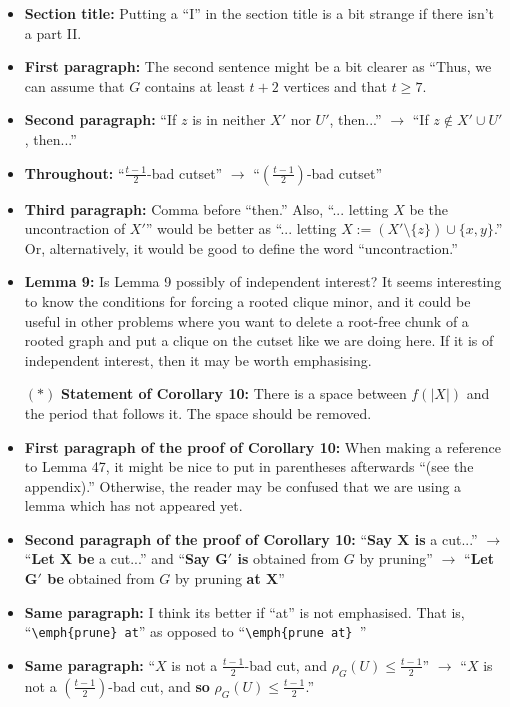 \documentclass[11 pt]{article}
\theoremstyle{definition}
\theoremstyle{case}
\numberwithin{equation}{section}
\begin{document}
\begin{itemize}
\item \textbf{Section title:} Putting a ``I'' in the section title is a bit strange if there isn't a part II. 
\item \textbf{First paragraph:} The second sentence might be a bit clearer as ``Thus, we can assume that $G$ contains at least $t+2$ vertices and that $t\geq7$. 
\item \textbf{Second paragraph:} ``If $z$ is in neither $X'$ nor $U'$, then...'' $\to$ ``If $z\notin X'\cup U'$, then...''
\item \textbf{Throughout:} ``$\frac{t-1}{2}$-bad cutset'' $\to$ ``$\left(\frac{t-1}{2}\right)$-bad cutset''
\item \textbf{Third paragraph:} Comma before ``then.'' Also, ``... letting $X$ be the uncontraction of $X'$'' would be better as ``... letting $X:=(X'\setminus \{z\})\cup\{x,y\}$.'' Or, alternatively, it would be good to define the word ``uncontraction.''
\item \textbf{Lemma 9:} Is Lemma 9 possibly of independent interest? It seems interesting to know the conditions for forcing a rooted clique minor, and it could be useful in other problems where you want to delete a root-free chunk of a rooted graph and put a clique on the cutset like we are doing here. If it is of independent interest, then it may be worth emphasising. 
\item[$\boldsymbol{(*)}$] \textbf{Statement of Corollary 10:} There is a space between $f(|X|)$ and the period that follows it. The space should be removed. 
\item \textbf{First paragraph of the proof of Corollary 10:} When making a reference to Lemma 47, it might be nice to put in parentheses afterwards ``(see the appendix).'' Otherwise, the reader may be confused that we are using a lemma which has not appeared yet.
\item \textbf{Second paragraph of the proof of Corollary 10:} ``\textbf{Say $\boldsymbol{X}$ is} a cut...'' $\to$ ``\textbf{Let $\boldsymbol{X}$ be} a cut...'' and ``\textbf{Say $\boldsymbol{G'}$ is} obtained from $G$ by pruning'' $\to$ ``\textbf{Let $\boldsymbol{G'}$ be} obtained from $G$ by pruning \textbf{at $\boldsymbol{X}$}''
\item \textbf{Same paragraph:} I think its better if ``at'' is not emphasised. That is, ``\texttt{\textbackslash{emph\{prune\}} at}'' as opposed to ``\texttt{\textbackslash{emph\{prune at\}} }''
\item \textbf{Same paragraph:} ``$X$ is not a $\frac{t-1}{2}$-bad cut, and $\rho_G(U)\leq \frac{t-1}{2}$'' $\to$ ``$X$ is not a $\left(\frac{t-1}{2}\right)$-bad cut, and \textbf{so} $\rho_G(U)\leq \frac{t-1}{2}$.'' 

\end{itemize}
\end{document}
